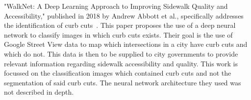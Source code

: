 "WalkNet: A Deep Learning Approach to Improving Sidewalk Quality and Accessibility," published in 2018  by Andrew Abbott et al., specifically addresses the identification of curb cuts~\cite{walknet}.
This paper proposes the use of a deep neural network to classify images in which curb cuts exists.
Their goal is the use of Google Street View data to map which intersections in a city have curb cuts and which do not.
This data is then to be supplied to city governments to provide relevant information regarding sidewalk accessibility and quality.
This work is focussed on the classification images which contained curb cuts and not the segmentation of said curb cuts. The neural network architecture they used was not described in depth.
